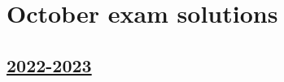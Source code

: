 
\newpage
\thispagestyle{empty}
\section{October exam solutions}


\subsection[2022-2023]{\hyperref[sec:kr_01_2022_2023]{2022-2023}}
\label{sec:sol_kr_01_2022_2023} %

